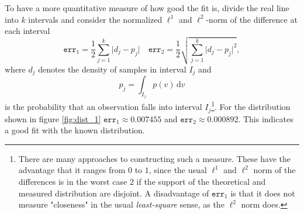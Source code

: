 To have a more quantitative measure of how good the fit is, divide the real line into $k$ intervals and consider the normalized $\ell^1$ and $\ell^2$-norm of the difference at each interval 
\begin{equation}\label{eq:err}
	\texttt{err}_{1}= \frac{1}{2} \sum_{j=1}^{k} \rvert d_j - p_j\lvert \quad 	\texttt{err}_{2}= \frac{1}{2} \sqrt{\sum_{j=1}^{k} \rvert d_j - p_j\lvert^2},
\end{equation}
where $d_j$ denotes the density of samples in interval $I_j$ and 
\[
	p_j = \int_{I_j} p(v) \, \text{d}v
\]
is the probability that an observation falls into interval $I_j$\footnote{There are many approaches to constructing such a measure. These have the advantage that it ranges from $0$ to $1$, since the usual $\ell^1$ and $\ell^2$ norm of the differences is in the worst case $2$ if the support of the theoretical and measured distribution are disjoint. A disadvantage of $\texttt{err}_1$ is that it does not measure "closeness" in the usual \textit{least-square} sense, as the $\ell^2$ norm does.}. For the distribution shown in figure \ref{fig:dist_1} $\texttt{err}_1 \approx  0.007455$ and $\texttt{err}_2 \approx 0.000892$. This indicates a good fit with the known distribution.

%
%
%
%
%
